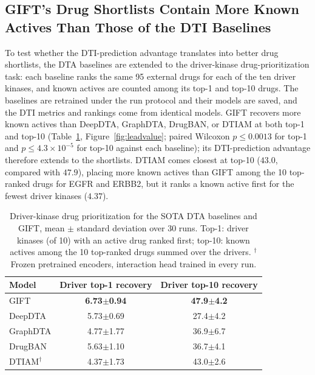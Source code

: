 \documentclass[11pt,letterpaper]{article}
\begin{document}
\subsection{GIFT's Drug Shortlists Contain More Known Actives Than Those of the DTI Baselines}
\label{sec:sota_leadprio}
To test whether the DTI-prediction advantage translates into better drug shortlists, the DTA baselines are extended to the driver-kinase drug-prioritization task: each baseline ranks the same 95 external drugs for each of the ten driver kinases, and known actives are counted among its top-1 and top-10 drugs. The baselines are retrained under the run protocol and their models are saved, and the DTI metrics and rankings come from identical models. GIFT recovers more known actives than DeepDTA, GraphDTA, DrugBAN, or DTIAM at both top-1 and top-10 (Table~\ref{tab:sota_leadprio}, Figure~\ref{fig:leadvalue}; paired Wilcoxon $p\leq0.0013$ for top-1 and $p\leq4.3\times10^{-5}$ for top-10 against each baseline); its DTI-prediction advantage therefore extends to the shortlists. DTIAM comes closest at top-10 ($43.0$, compared with $47.9$), placing more known actives than GIFT among the 10 top-ranked drugs for EGFR and ERBB2, but it ranks a known active first for the fewest driver kinases ($4.37$).

\begin{table}[!t]
\centering
\caption{Driver-kinase drug prioritization for the SOTA DTA baselines and GIFT, mean $\pm$ standard deviation over 30 runs. Top-1: driver kinases (of 10) with an active drug ranked first; top-10: known actives among the 10 top-ranked drugs summed over the drivers. $^{\dagger}$Frozen pretrained encoders, interaction head trained in every run.}
\label{tab:sota_leadprio}
\small
\begin{tabular}{lcc}
\toprule
\textbf{Model} & \textbf{Driver top-1 recovery} & \textbf{Driver top-10 recovery} \\
\midrule
GIFT & \textbf{6.73$\pm$0.94} & \textbf{47.9$\pm$4.2} \\
DeepDTA & 5.73$\pm$0.69 & 27.4$\pm$4.2 \\
GraphDTA & 4.77$\pm$1.77 & 36.9$\pm$6.7 \\
DrugBAN & 5.63$\pm$1.10 & 36.7$\pm$4.1 \\
DTIAM$^{\dagger}$ & 4.37$\pm$1.73 & 43.0$\pm$2.6 \\
\bottomrule
\end{tabular}
\end{table}
\end{document}
